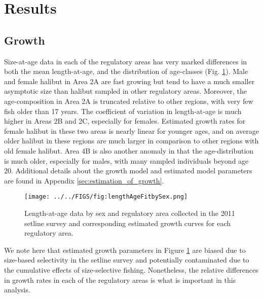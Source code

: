 \section*{Results} %
\label{sec:results}

\subsection*{Growth} %
\label{sub:growth}

Size-at-age data in each of the regulatory areas has very marked differences in both the mean length-at-age, and the distribution of age-classes (Fig. \ref{fig:FIGS_fig:lengthAgeFitbySex}). Male and female halibut in Area 2A are fast growing but tend to have a much smaller asymptotic size than halibut sampled in other regulatory areas.  Moreover, the age-composition in Area 2A is truncated relative to other regions, with very few fish older than 17 years.  The coefficient of variation in length-at-age is much higher in Areas 2B and 2C, especially for females.  Estimated growth rates for female halibut in these two areas is nearly linear for younger ages, and on average older halibut in these regions are much larger in comparison to other regions with old female halibut.  Area 4B is also another anomaly in that the age-distribution is much older, especially for males, with many sampled individuals beyond age 20.  Additional details about the growth model and estimated model parameters are found in Appendix \ref{sec:estimation_of_growth}.

\begin{figure}[htbp]
	\centering
		\texttt{[image: ../../FIGS/fig:lengthAgeFitbySex.png]}
	\caption{Length-at-age data by sex and regulatory area collected in the 2011 setline survey and corresponding estimated growth curves for each regulatory area.}
	\label{fig:FIGS_fig:lengthAgeFitbySex}
\end{figure}

We note here that estimated growth parameters in Figure \ref{fig:FIGS_fig:lengthAgeFitbySex} are biased due to size-based selectivity in the setline survey and potentially contaminated due to the cumulative effects of size-selective fishing.  Nonetheless, the relative differences in growth rates in each of the regulatory areas is what is important in this analysis.


